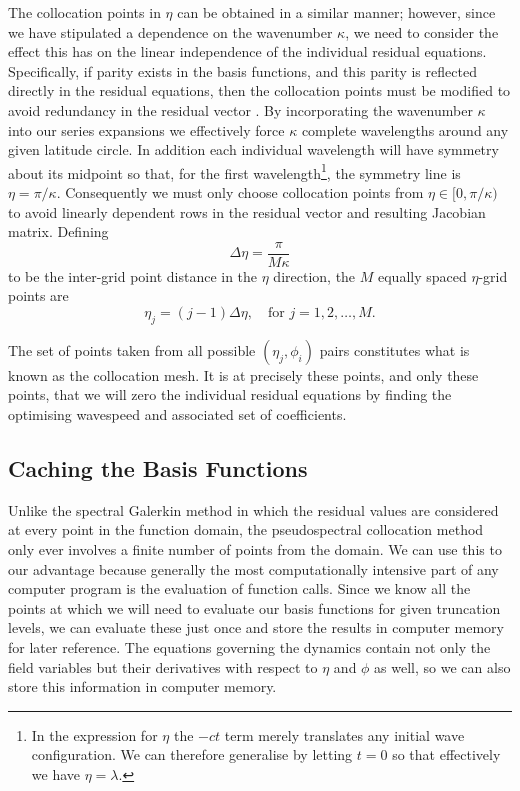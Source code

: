 The collocation points in $\eta$ can be obtained in a similar manner; however, since we have stipulated a dependence on the wavenumber $\kappa$, we need to consider the effect this has on the linear independence of the individual residual equations. Specifically, if parity exists in the basis functions, and this parity is reflected directly in the residual equations, then the collocation points must be modified to avoid redundancy in the residual vector \cite[pages 159--171]{Boyd:CFSM}. By incorporating the wavenumber $\kappa$ into our series expansions we effectively force $\kappa$ complete wavelengths around any given latitude circle. In addition each individual wavelength will have symmetry about its midpoint so that, for the first wavelength\footnote{In the expression for $\eta$ the $-ct$ term merely translates any initial wave configuration. We can therefore generalise by letting $t=0$ so that effectively we have $\eta=\lambda$.}, the symmetry line is $\eta = \pi / \kappa$. Consequently we must only choose collocation points from $\eta \in [0,\pi/\kappa)$ to avoid linearly dependent rows in the residual vector and resulting Jacobian matrix. Defining 
\begin{equation}
\Delta \eta = \frac{\pi}{M\kappa} \label{eq:deleta}
\end{equation}
to be the inter-grid point distance in the $\eta$ direction, the $M$ equally spaced $\eta$-grid points are
\begin{equation}
\eta_j = (j-1) \Delta \eta, \quad \text{for } j=1,2,\ldots,M. \label{etagrid}
\end{equation}

The set of points taken from all possible $(\eta_j,\phi_i)$ pairs constitutes what is known as the collocation mesh. It is at precisely these points, and only these points, that we will zero the individual residual equations by finding the optimising wavespeed and associated set of coefficients. 

\subsection{Caching the Basis Functions}
Unlike the spectral Galerkin method in which the residual values are considered at every point in the function domain, the pseudospectral collocation method only ever involves a finite number of points from the domain. We can use this to our advantage because generally the most computationally intensive part of any computer program is the evaluation of function calls. Since we know all the points at which we will need to evaluate our basis functions for given truncation levels, we can evaluate these just once and store the results in computer memory for later reference. The equations governing the dynamics contain not only the field variables but their derivatives with respect to $\eta$ and $\phi$ as well, so we can also store this information in computer memory.

